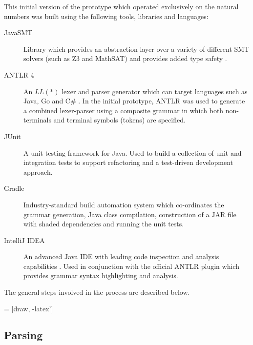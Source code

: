 \documentclass[a4paper]{article}
\begin{document}
    This initial version of the prototype which operated exclusively on the natural numbers was built using the following tools, libraries and languages:
    
    \begin{description}
        \item[JavaSMT] Library which provides an abstraction layer over a variety of different SMT solvers (such as Z3 and MathSAT) and provides added type safety \citep{karpenkov2016javasmt}.
        \item[ANTLR 4] An $LL(*)$ lexer and parser generator which can target languages such as Java, Go and C\# \citep{parr2011ll}. In the initial prototype, ANTLR was used to generate a combined lexer-parser using a composite grammar in which both non-terminals and terminal symbols (tokens) are specified.
        \item[JUnit] A unit testing framework for Java. Used to build a collection of unit and integration tests to support refactoring and a test-driven development approach.
        \item[Gradle] Industry-standard build automation system which co-ordinates the grammar generation, Java class compilation, construction of a JAR file with shaded dependencies and running the unit tests.
        \item[IntelliJ IDEA] An advanced Java IDE with leading code inspection and analysis capabilities \citep{ideainspections} \citep{Jemerov:2008:IRI:1636642.1636655}. Used in conjunction with the official ANTLR plugin which provides grammar syntax highlighting and analysis.
    \end{description}

    The general steps involved in the process are described below.
    
     = [draw, -latex']

        \subsection*{Parsing}
        
\end{document}
